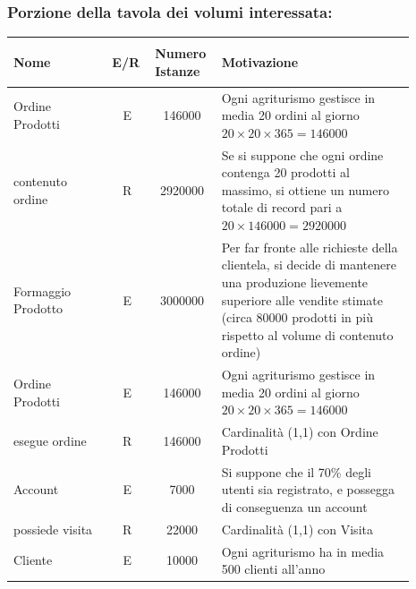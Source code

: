 \documentclass[12pt,a4paper]{article}
\begin{document}
\subsubsection*{Porzione della tavola dei volumi interessata:}
\begin{center}\setlength{\extrarowheight}{1.5pt}\begin{longtable}{|p{0.23\linewidth}|p{0.1\linewidth}|p{0.11\linewidth}|p{0.45\linewidth}|}
\hline \textbf{Nome}   & \begin{center}\vspace{-15pt}\textbf{E/R}\end{center} & \textbf{Numero Istanze} & \textbf{Motivazione}\\ 
\hline
Ordine Prodotti
 & 
\multicolumn{1}{|c|}{E}
 & 
\multicolumn{1}{|c|}{146000}
 & 
 Ogni agriturismo gestisce in media 20 ordini al giorno $20\times 20\times 365 = 146000$
\\

\hline
contenuto ordine
 & 
\multicolumn{1}{|c|}{R}
 & 
\multicolumn{1}{|c|}{2920000}
 & 
 Se si suppone che ogni ordine contenga 20 prodotti al massimo, si ottiene un numero totale di record pari a $20\times146000=2920000$
\\

\hline
 Formaggio Prodotto
 & 
\multicolumn{1}{|c|}{E}
 & 
\multicolumn{1}{|c|}{3000000}
 & 
Per far fronte alle richieste della clientela, si decide di mantenere una produzione lievemente superiore alle vendite stimate (circa 80000 prodotti in più rispetto al volume di contenuto ordine)
\\

\hline
Ordine Prodotti
 & 
\multicolumn{1}{|c|}{E}
 & 
\multicolumn{1}{|c|}{146000}
 & 
 Ogni agriturismo gestisce in media 20 ordini al giorno $20\times 20\times 365 = 146000$
\\

\hline
esegue ordine
 & 
\multicolumn{1}{|c|}{R}
 & 
\multicolumn{1}{|c|}{146000}
 & 
Cardinalità (1,1) con Ordine Prodotti
\\

\hline
Account
 & 
\multicolumn{1}{|c|}{E}
 & 
\multicolumn{1}{|c|}{7000}
 & 
Si suppone che il 70\% degli utenti sia registrato, e possegga di conseguenza un account
\\

\hline
possiede visita
 & 
\multicolumn{1}{|c|}{R}
 & 
\multicolumn{1}{|c|}{22000}
 & 
Cardinalità (1,1) con Visita
\\

\hline
Cliente
 & 
\multicolumn{1}{|c|}{E}
 & 
\multicolumn{1}{|c|}{10000}
 & 
Ogni agriturismo ha in media 500 clienti all'anno
\\


\end{longtable}
\end{center}
\end{document}
